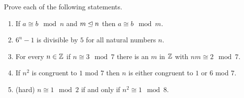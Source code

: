 \begin{xca}
	Prove each of the following statements.
	
	\begin{enumerate}
			\item If $a \cong b \mod n$  and $m \trianglelefteq n$ then $a \cong b \mod m$.
			\item $6^n - 1$ is divisible by $5$ for all natural numbers $n$.
			\item For every $n \in \mathbb{Z}$ if $n \cong 3 \mod 7$ there is an $m$ in $\mathbb{Z}$ with $nm \cong 2 \mod 7$.
			\item If $n^2$ is congruent to $1$ mod $7$ then $n$ is either congruent to $1$ or $6$ mod $7$.  
			\item (hard) $n \cong 1 \mod 2$ if and only if $n^2 \cong 1 \mod 8$.
	\end{enumerate}
\end{xca}







